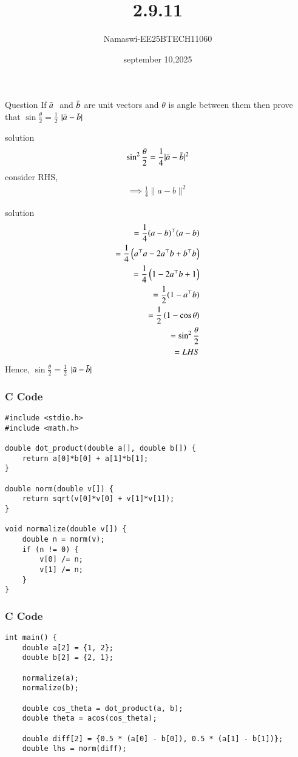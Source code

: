 \documentclass{beamer}
\begin{document}
\title 
{2.9.11}
\date{september 10,2025}
\author 
{Namaswi-EE25BTECH11060}
\frame{\titlepage}
\begin{frame}{Question}
If $\Bar{a} \;$ and \;$ \Bar{b} $ are unit vectors and $\theta$ is angle between them then prove that $\sin\frac{\theta}{2}=\frac{1}{2}$ $| {\Bar{a}-\Bar{b}}|$
\end{frame}
\begin{frame}{solution}
  \begin{align*}
    \sin^2\frac{\theta}{2}=\frac{1}{4}| {\Bar{a}-\Bar{b}}|^2\\
    \end{align*}
  consider RHS,\\
\begin{align}
 \implies \frac{1}{4} \|a-b\|^2
 \end{align}
\end{frame}
\begin{frame}{solution}
  \begin{align}
       = \frac{1}{4}(a-b)^\top  (a-b)\\
 = \frac{1}{4} \left(a ^\top a - 2 a ^\top b + b ^\top b\right)\\
  =\frac{1}{4} \left(  1 - 2 a ^\top b + 1 \right)\\
  = \frac{1}{2} (1 - a ^\top b)\\
  =\frac{1}{2}\left(1-\cos \theta\right)\\
  =\sin^2{\frac{\theta}{2}}\\
=LHS
\end{align}
Hence, $\sin\frac{\theta}{2}=\frac{1}{2}$  $| {\Bar{a}-\Bar{b}}|
$ 
\end{frame}
 
\begin{frame}[fragile]
\frametitle{C Code }
\begin{lstlisting}
#include <stdio.h>
#include <math.h>

double dot_product(double a[], double b[]) {
    return a[0]*b[0] + a[1]*b[1];
}

double norm(double v[]) {
    return sqrt(v[0]*v[0] + v[1]*v[1]);
}

void normalize(double v[]) {
    double n = norm(v);
    if (n != 0) {
        v[0] /= n;
        v[1] /= n;
    }
}
\end{lstlisting}
\end{frame}

\begin{frame}[fragile]
    \frametitle{C Code}
    \begin{lstlisting}
int main() {
    double a[2] = {1, 2};
    double b[2] = {2, 1};

    normalize(a);
    normalize(b);

    double cos_theta = dot_product(a, b);
    double theta = acos(cos_theta); 

    double diff[2] = {0.5 * (a[0] - b[0]), 0.5 * (a[1] - b[1])};
    double lhs = norm(diff);
\end{lstlisting}
\end{frame}
\end{document}
